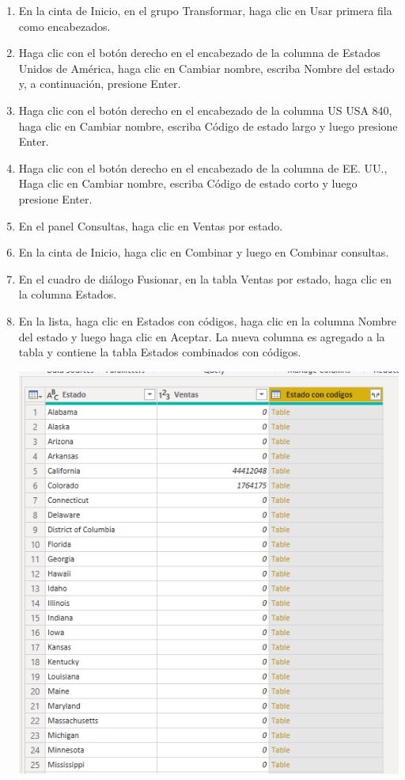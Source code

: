 \begin{enumerate}
 
    \item En la cinta de Inicio, en el grupo Transformar, haga clic en Usar primera fila como encabezados.


    \item Haga clic con el botón derecho en el encabezado de la columna de Estados Unidos de América, haga clic en Cambiar nombre, escriba Nombre del estado y, a continuación, presione Enter.
    
    
    
    \item Haga clic con el botón derecho en el encabezado de la columna US USA 840, haga clic en Cambiar nombre, escriba Código de estado largo y luego presione Enter.
     
    \item Haga clic con el botón derecho en el encabezado de la columna de EE. UU., Haga clic en Cambiar nombre, escriba Código de estado corto y luego presione Enter.
    
    \item En el panel Consultas, haga clic en Ventas por estado.
    
    \item En la cinta de Inicio, haga clic en Combinar y luego en Combinar consultas.
    
    
    \item En el cuadro de diálogo Fusionar, en la tabla Ventas por estado, haga clic en la columna Estados.
    
    
    \item En la lista, haga clic en Estados con códigos, haga clic en la columna Nombre del estado y luego haga clic en Aceptar. La nueva columna es agregado a la tabla y contiene la tabla Estados combinados con códigos.
    \begin{center}
	\includegraphics[width=13cm]{./Imagenes/10}
	\end{center}



\end{enumerate}

